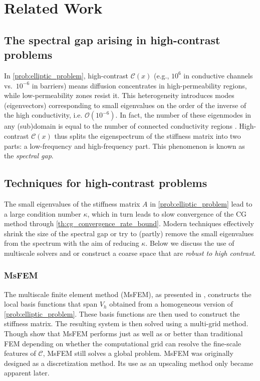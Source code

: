 \chapter{Related Work}\label{ch:literature}
\section{The spectral gap arising in high-contrast problems}\label{sec:spectral_gap_darcy}
In \cref{prob:elliptic_problem}, high-contrast $\mathcal{C}(x)$ (e.g., $10^6$ in conductive channels vs.\ $ 10^{-6} $ in barriers) means diffusion concentrates in high-permeability regions, while low-permeability zones resist it. This heterogeneity introduces modes (eigenvectors) corresponding to small eigenvalues on the order of the inverse of the high conductivity, i.e. $\mathcal{O}(10^{-6})$. In fact, the number of these eigenmodes in any (sub)domain is equal to the number of connected conductivity regions \cite{ddp_for_multiscale_flows_in_high_contrast_media_Galvis2010}. High-contrast $\mathcal{C}(x)$ thus splits the eigenspectrum of the stiffness matrix into two parts: a low-frequency and high-frequency part. This phenomenon is known as the \textit{spectral gap}.

\section{Techniques for high-contrast problems}\label{sec:tailored_coarse_spaces}
The small eigenvalues of the stiffness matrix $A$ in \cref{prob:elliptic_problem} lead to a large condition number $\kappa$, which in turn leads to slow convergence of the CG method through \cref{th:cg_convergence_rate_bound}. Modern techniques effectively shrink the size of the spectral gap or try to (partly) remove the small eigenvalues from the spectrum with the aim of reducing $\kappa$. Below we discuss the use of multiscale solvers and or construct a coarse space that are \textit{robust to high contrast}.

\subsection{MsFEM}
The multiscale finite element method (MsFEM), as presented in \cite{og_msfem_Hou1997}, constructs the local basis functions that span $V_h$ obtained from a homogeneous version of \cref{prob:elliptic_problem}. These basis functions are then used to construct the stiffness matrix. The resulting system is then solved using a multi-grid method. Though \citeauthor{og_msfem_Hou1997} show that MsFEM performs just as well as or better than traditional FEM depending on whether the computational grid can resolve the fine-scale features of $\mathcal{C}$, MsFEM still solves a global problem. MsFEM was originally designed as a discretization method. Its use as an upscaling method only became apparent later.

